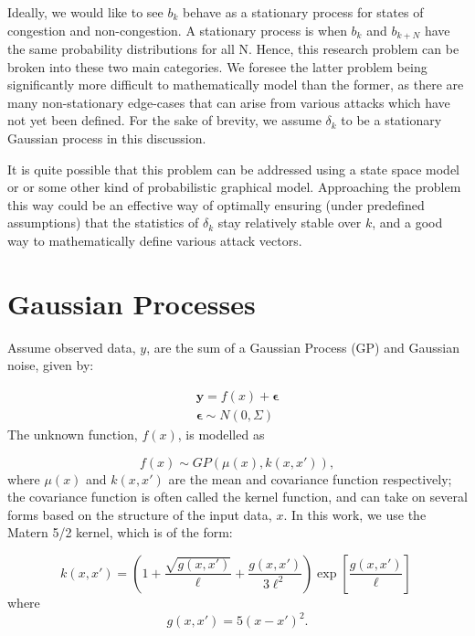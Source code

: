 \documentclass[peerreview]{ieeesyscoin}
\begin{document}
Ideally, we would like to see $b_{k}$ behave as a stationary process for states of congestion and non-congestion. A stationary process is when $b_{k}$ and $b_{k+N}$ have the same probability distributions for all N. Hence, this research problem can be broken into these two main categories. We foresee the latter problem being significantly more difficult to mathematically model than the former, as there are many non-stationary edge-cases that can arise from various attacks which have not yet been defined. For the sake of brevity, we assume $\delta_{k}$ to be a stationary Gaussian process in this discussion.

It is quite possible that this problem can be addressed using a state space model or or some other kind of probabilistic graphical model. Approaching the problem this way could be an effective way of optimally ensuring (under predefined assumptions) that the statistics of $\delta_{k}$ stay relatively stable over $k$, and a good way to mathematically define various attack vectors.

\section{Gaussian Processes}
\label{appendix:marginal}

Assume observed data, $y$, are the sum of a Gaussian Process (GP) and Gaussian noise, given by:

\begin{eqnarray}
\mathbf{y} = f(x) + \mathbf{\epsilon}  \\
\mathbf{\epsilon}  \sim N(0,\Sigma) 
\end{eqnarray}
The unknown function, $f(x)$, is modelled as

\begin{equation}
f(x) \sim GP(\mu(x), k(x,x')),
\end{equation}
where $\mu(x)$ and $k(x,x')$ are the mean and covariance function respectively; the covariance function is often called the kernel function, and can take on several forms based on the structure of the input data, $x$. In this work, we use the Matern 5/2 kernel, which is of the form:

\begin{equation}
k(x,x') = \left( 1 + \dfrac{\sqrt{g(x,x')}}{\ell} + \dfrac{g(x,x')}{3\ell^2}\right)\exp\left[ \dfrac{g(x,x')}{\ell} \right]\ 
\end{equation}
where
\begin{equation}
	g(x,x') = 5(x-x')^2.
\end{equation}
\end{document}
